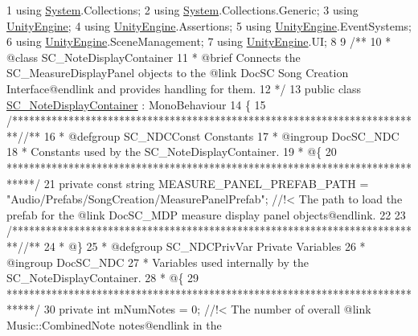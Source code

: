 \begin{DoxyCodeInclude}
1 \textcolor{keyword}{using} \hyperlink{namespace_system}{System}.Collections;
2 \textcolor{keyword}{using} \hyperlink{namespace_system}{System}.Collections.Generic;
3 \textcolor{keyword}{using} \hyperlink{namespace_unity_engine}{UnityEngine};
4 \textcolor{keyword}{using} \hyperlink{namespace_unity_engine}{UnityEngine}.Assertions;
5 \textcolor{keyword}{using} \hyperlink{namespace_unity_engine}{UnityEngine}.EventSystems;
6 \textcolor{keyword}{using} \hyperlink{namespace_unity_engine}{UnityEngine}.SceneManagement;
7 \textcolor{keyword}{using} \hyperlink{namespace_unity_engine}{UnityEngine}.UI;
8 \textcolor{comment}{}
9 \textcolor{comment}{/**}
10 \textcolor{comment}{ * @class SC\_NoteDisplayContainer}
11 \textcolor{comment}{ * @brief Connects the SC\_MeasureDisplayPanel objects to the @link DocSC Song Creation Interface@endlink
       and provides handling for them.}
12 \textcolor{comment}{*/}
13 \textcolor{keyword}{public} \textcolor{keyword}{class }\hyperlink{class_s_c___note_display_container}{SC\_NoteDisplayContainer} : MonoBehaviour
14 \{
15     \textcolor{comment}{/*************************************************************************/}\textcolor{comment}{/** }
16 \textcolor{comment}{    * @defgroup SC\_NDCConst Constants}
17 \textcolor{comment}{    * @ingroup DocSC\_NDC}
18 \textcolor{comment}{    * Constants used by the SC\_NoteDisplayContainer.}
19 \textcolor{comment}{    * @\{}
20 \textcolor{comment}{    *****************************************************************************/}
21     \textcolor{keyword}{private} \textcolor{keyword}{const} \textcolor{keywordtype}{string} MEASURE\_PANEL\_PREFAB\_PATH = \textcolor{stringliteral}{"Audio/Prefabs/SongCreation/MeasurePanelPrefab"}; \textcolor{comment}{//!<
       The path to load the prefab for the @link DocSC\_MDP measure display panel objects@endlink.}
22 \textcolor{comment}{}
23     \textcolor{comment}{/*************************************************************************/}\textcolor{comment}{/** }
24 \textcolor{comment}{    * @\}}
25 \textcolor{comment}{    * @defgroup SC\_NDCPrivVar Private Variables}
26 \textcolor{comment}{    * @ingroup DocSC\_NDC}
27 \textcolor{comment}{    * Variables used internally by the SC\_NoteDisplayContainer.}
28 \textcolor{comment}{    * @\{}
29 \textcolor{comment}{    *****************************************************************************/}
30     \textcolor{keyword}{private} \textcolor{keywordtype}{int} mNumNotes = 0; \textcolor{comment}{//!< The number of overall @link Music::CombinedNote notes@endlink in the
}
\end{DoxyCodeInclude}
